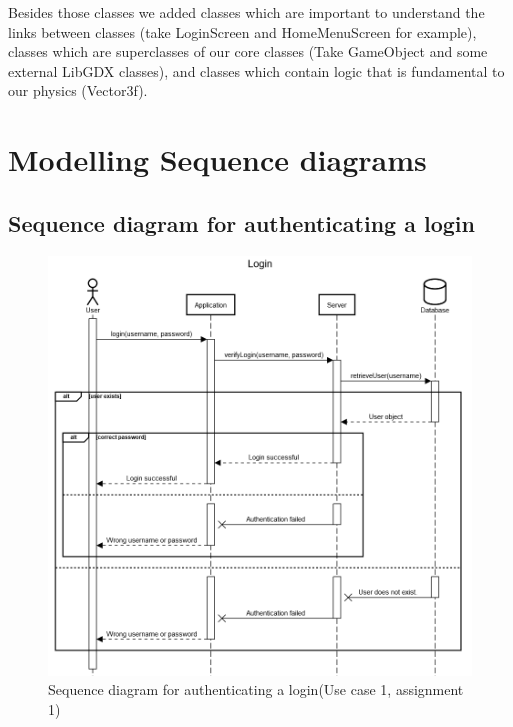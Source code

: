 \documentclass[10pt]{article}
\let\oldsection\section
\renewcommand\section{\clearpage\oldsection}
\begin{document}
\par Besides those classes we added classes which are important to understand the links between classes (take LoginScreen and HomeMenuScreen for example), classes which are superclasses of our core classes (Take GameObject and some external LibGDX classes), and classes which contain logic that is fundamental to our physics (Vector3f).


\section{Modelling Sequence diagrams}
	\subsection{Sequence diagram for authenticating a login}
		\begin{figure}[H]
			\includegraphics[width=\linewidth]{latex_images/sequenceLogin.png}
			\caption{Sequence diagram for authenticating a login(Use case 1, assignment 1)}
		\end{figure}
\end{document}
